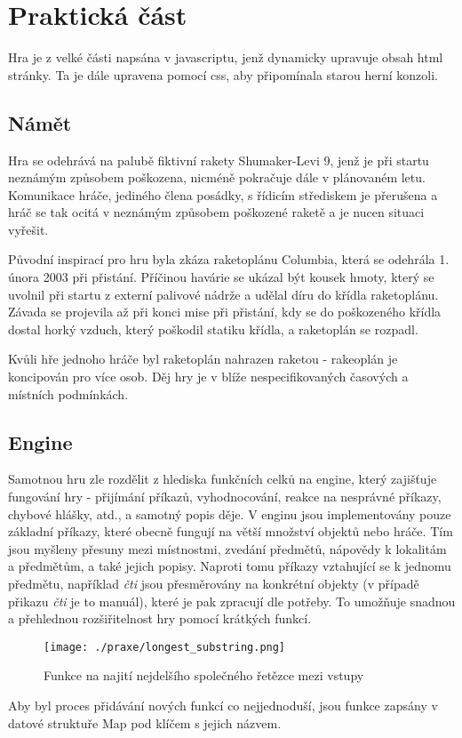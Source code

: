 \documentclass[main.tex]{subfiles}
\begin{document}
\section{Praktická část}
Hra je z velké části napsána v javascriptu, jenž dynamicky upravuje obsah html stránky. Ta je dále upravena pomocí css, aby připomínala starou herní konzoli. 

\subsection{Námět}
Hra se odehrává na palubě fiktivní rakety Shumaker-Levi 9, jenž je při startu neznámým způsobem poškozena, nicméně pokračuje dále v plánovaném letu. Komunikace hráče, jediného člena posádky, s řídicím střediskem je přerušena a hráč se tak ocitá v neznámým způsobem poškozené raketě a je nucen situaci vyřešit. 

Původní inspirací pro hru byla zkáza raketoplánu Columbia, která se odehrála 1. února 2003 při přistání. Příčinou havárie se ukázal být kousek hmoty, který se uvolnil při startu z externí palivové nádrže a udělal díru do křídla raketoplánu. Závada se projevila až při konci mise při přistání, kdy se do poškozeného křídla dostal horký vzduch, který poškodil statiku křídla, a raketoplán se rozpadl. \cite{web:wik:cz:columbia} 

Kvůli hře jednoho hráče byl raketoplán nahrazen raketou - rakeoplán je koncipován pro více osob. Děj hry je v blíže nespecifikovaných časových a místních podmínkách.

\subsection{Engine}
Samotnou hru zle rozdělit z hlediska funkčních celků na engine, který zajišťuje fungování hry - přijímání příkazů, vyhodnocování, reakce na nesprávné příkazy, chybové hlášky, atd., a samotný popis děje.
V enginu jsou implementovány pouze základní příkazy, které obecně fungují na větší množství objektů nebo hráče. Tím jsou myšleny přesuny mezi místnostmi, zvedání předmětů, nápovědy k lokalitám a předmětům, a také jejich popisy. Naproti tomu příkazy vztahující se k jednomu předmětu, například \textit{čti} jsou přesměrovány na konkrétní objekty (v případě přikazu \textit{čti} je to manuál), které je pak zpracují dle potřeby. To umožňuje snadnou a přehlednou rozšiřitelnost hry pomocí krátkých funkcí.

		\begin{figure}[h]
			\centering
			\texttt{[image: ./praxe/longest\_substring.png]}
			\caption{Funkce na najití nejdelšího společného řetězce mezi vstupy }
		\end{figure}
Aby byl proces přidávání nových funkcí co nejjednoduší, jsou funkce zapsány v datové struktuře Map pod klíčem s jejich názvem. 
\end{document}
